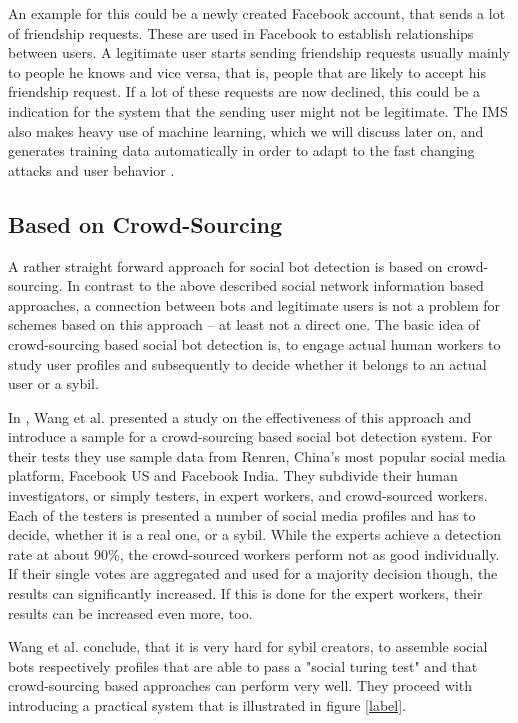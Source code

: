 An example for this could be a newly created Facebook account, that sends a lot of friendship requests. These are used in Facebook to establish relationships between users. A legitimate user starts sending friendship requests usually mainly to people he knows and vice versa, that is, people that are likely to accept his friendship request. If a lot of these requests are now declined, this could be a indication for the system that the sending user might not be legitimate.  The IMS also makes heavy use of machine learning, which we will discuss later on, and generates training data automatically in order to adapt to the fast changing attacks and user behavior \cite{fis}.

\subsection{Based on Crowd-Sourcing}
A rather straight forward approach for social bot detection is based on crowd-sourcing. In contrast to the above described social network information based approaches, a connection between bots and legitimate users is not a problem for schemes based on this approach -- at least not a direct one. The basic idea of crowd-sourcing based social bot detection is, to engage actual human workers to study user profiles and subsequently to decide whether it belongs to an actual user or a sybil.

In \cite{wangcrowd}, Wang et al. presented a study on the effectiveness of this approach and introduce a sample for a crowd-sourcing based social bot detection system.  For their tests they use sample data from Renren, China's most popular social media platform, Facebook US and Facebook India. They subdivide their human investigators, or simply testers, in expert workers, and crowd-sourced workers.  Each of the testers is presented a number of social media profiles and has to decide, whether it is a real one, or a sybil. While the experts achieve a detection rate at about 90\%, the crowd-sourced workers perform not as good individually. If their single votes are aggregated and used for a majority decision though, the results can significantly increased. If this is done for the expert workers, their results can be increased even more, too.   

Wang et al. conclude, that it is very hard for sybil creators, to assemble social bots respectively profiles that are able to pass a "social turing test" and that crowd-sourcing based approaches can perform very well. They proceed with introducing a practical system that is illustrated in figure \ref{label}.

